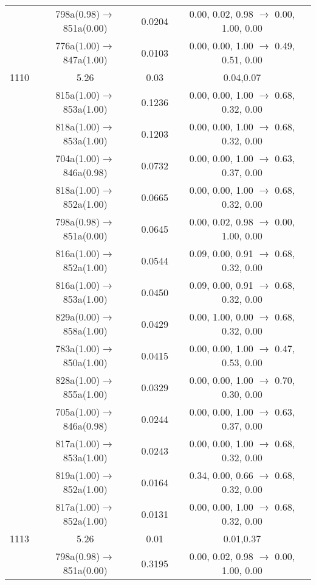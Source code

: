 \documentclass[10pt,a4paper]{article}
\begin{document}
\begin{longtable}{c|c|c|c}
 	& 798a(0.98)$\rightarrow$851a(0.00) &	 0.0204 &	 0.00, 0.02, 0.98 $\rightarrow$ 0.00, 1.00, 0.00 \\ 
 	& 776a(1.00)$\rightarrow$847a(1.00) &	 0.0103 &	 0.00, 0.00, 1.00 $\rightarrow$ 0.49, 0.51, 0.00 \\ 
 \hline1110 &	 5.26 &	 0.03 &	 0.04,0.07 \\ 
  	& 815a(1.00)$\rightarrow$853a(1.00) &	 0.1236 &	 0.00, 0.00, 1.00 $\rightarrow$ 0.68, 0.32, 0.00 \\ 
 	& 818a(1.00)$\rightarrow$853a(1.00) &	 0.1203 &	 0.00, 0.00, 1.00 $\rightarrow$ 0.68, 0.32, 0.00 \\ 
 	& 704a(1.00)$\rightarrow$846a(0.98) &	 0.0732 &	 0.00, 0.00, 1.00 $\rightarrow$ 0.63, 0.37, 0.00 \\ 
 	& 818a(1.00)$\rightarrow$852a(1.00) &	 0.0665 &	 0.00, 0.00, 1.00 $\rightarrow$ 0.68, 0.32, 0.00 \\ 
 	& 798a(0.98)$\rightarrow$851a(0.00) &	 0.0645 &	 0.00, 0.02, 0.98 $\rightarrow$ 0.00, 1.00, 0.00 \\ 
 	& 816a(1.00)$\rightarrow$852a(1.00) &	 0.0544 &	 0.09, 0.00, 0.91 $\rightarrow$ 0.68, 0.32, 0.00 \\ 
 	& 816a(1.00)$\rightarrow$853a(1.00) &	 0.0450 &	 0.09, 0.00, 0.91 $\rightarrow$ 0.68, 0.32, 0.00 \\ 
 	& 829a(0.00)$\rightarrow$858a(1.00) &	 0.0429 &	 0.00, 1.00, 0.00 $\rightarrow$ 0.68, 0.32, 0.00 \\ 
 	& 783a(1.00)$\rightarrow$850a(1.00) &	 0.0415 &	 0.00, 0.00, 1.00 $\rightarrow$ 0.47, 0.53, 0.00 \\ 
 	& 828a(1.00)$\rightarrow$855a(1.00) &	 0.0329 &	 0.00, 0.00, 1.00 $\rightarrow$ 0.70, 0.30, 0.00 \\ 
 	& 705a(1.00)$\rightarrow$846a(0.98) &	 0.0244 &	 0.00, 0.00, 1.00 $\rightarrow$ 0.63, 0.37, 0.00 \\ 
 	& 817a(1.00)$\rightarrow$853a(1.00) &	 0.0243 &	 0.00, 0.00, 1.00 $\rightarrow$ 0.68, 0.32, 0.00 \\ 
 	& 819a(1.00)$\rightarrow$852a(1.00) &	 0.0164 &	 0.34, 0.00, 0.66 $\rightarrow$ 0.68, 0.32, 0.00 \\ 
 	& 817a(1.00)$\rightarrow$852a(1.00) &	 0.0131 &	 0.00, 0.00, 1.00 $\rightarrow$ 0.68, 0.32, 0.00 \\ 
 \hline1113 &	 5.26 &	 0.01 &	 0.01,0.37 \\ 
  	& 798a(0.98)$\rightarrow$851a(0.00) &	 0.3195 &	 0.00, 0.02, 0.98 $\rightarrow$ 0.00, 1.00, 0.00 \\ 

\end{longtable}
\end{document}
